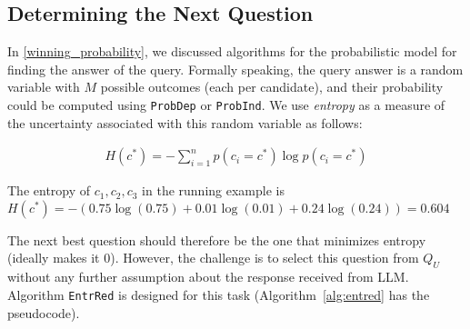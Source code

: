 \begin{comment}
  \subsubsection{Avoiding Memory Bottleneck} 
Through our stepwise process for computing winning probability for each candidate $c$, we iteratively compute probabilities of the form $P(c > c_i | conditions)$. For computing each term of the mentioned form, instead of maintaining a n-dimensional table to consider all possible value combinations for all candidates, we utilize memory usage by only storing the useful information which is a dictionary that its keys are the possible score values of $c_{i-1}$, and its values are the set of score values for $c$ that satisfy the conditions with respect to that $c_{i-1}$ value key. Hence, we only need to store $\mathcal{O}(m^2)$ instead of a huge table that requires $\mathcal{O}(m^n)$ space. 


\label{uncertainty}  
\end{comment}




\subsection{Determining the Next Question}\label{subsec:nextquestion}
In \autoref{winning_probability}, we discussed algorithms for the probabilistic model for finding the answer of the query. Formally speaking, the query answer is a random variable with $M$ possible outcomes (each per candidate), and their probability could be computed using {\tt ProbDep} or {\tt ProbInd}. We use {\em entropy} as a measure of the uncertainty associated with this random variable as follows:

\begin{align}\label{eq:entropy}
H(c^*) = - \sum_{i=1}^{n} p(c_i = c^*) \log p(c_i = c^*)
\end{align}

The entropy of $c_1, c_2, c_3$ in the running example is  $ H(c^*) = - \left( 0.75 \log(0.75) + 0.01 \log(0.01) + 0.24 \log(0.24) \right) = 0.604$
  
The next best question should therefore be the one that minimizes entropy (ideally makes it $0$). However, the challenge is to select this question from $Q_U$ without any further assumption about the response received from LLM. Algorithm {\tt EntrRed} is designed for this task (Algorithm~\ref{alg:entred} has the pseudocode).

